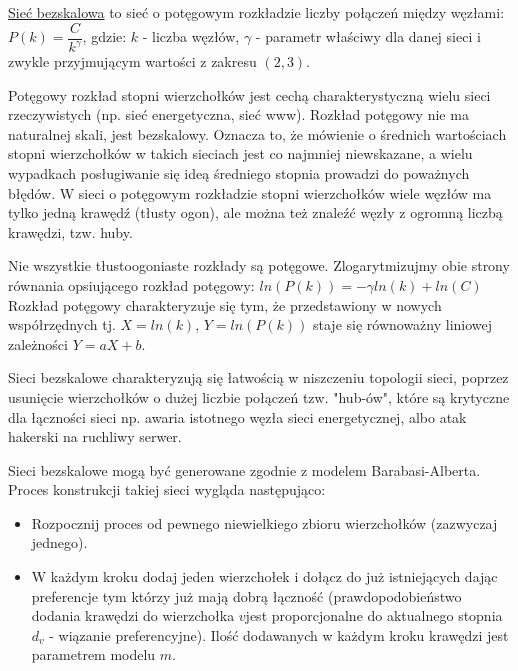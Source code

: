 \underline{Sieć bezskalowa} to sieć o potęgowym rozkładzie liczby połączeń między węzłami:\newline
$ P(k) = \dfrac{C}{k^{\gamma}} $, gdzie:\newline
$ k $ - liczba węzłów, \newline
$ \gamma $ - parametr właściwy dla danej sieci i zwykle przyjmującym wartości z zakresu $ (2, 3) $.

Potęgowy rozkład stopni wierzchołków jest cechą charakterystyczną wielu sieci rzeczywistych (np. sieć energetyczna, sieć www). Rozkład potęgowy nie ma naturalnej skali, jest bezskalowy. Oznacza to, że mówienie o średnich wartościach stopni wierzchołków w takich sieciach jest co najmniej niewskazane, a wielu wypadkach posługiwanie się ideą średniego stopnia prowadzi do poważnych błędów. W sieci o potęgowym rozkładzie stopni wierzchołków wiele węzłów ma tylko jedną krawędź (tłusty ogon), ale można też znaleźć węzły z ogromną liczbą krawędzi, tzw. huby.

Nie wszystkie tłustoogoniaste rozkłady są potęgowe. Zlogarytmizujmy obie strony równania opsiującego rozkład potęgowy:\newline
$ ln(P(k)) = -\gamma ln(k) + ln(C) $\newline
Rozkład potęgowy charakteryzuje się tym, że przedstawiony w nowych współrzędnych tj. $ X = ln(k) $, $ Y = ln(P(k)) $ staje się równoważny liniowej zależności $ Y = aX + b $.

Sieci bezskalowe charakteryzują się łatwością w niszczeniu topologii sieci, poprzez usunięcie wierzchołków o dużej liczbie połączeń tzw. "hub-ów", które są krytyczne dla łączności sieci np. awaria istotnego węzła sieci energetycznej, albo atak hakerski na ruchliwy serwer.

Sieci bezskalowe mogą być generowane zgodnie z modelem Barabasi-Alberta. Proces konstrukcji takiej sieci wygląda następująco:
\begin{itemize}
	\item Rozpocznij proces od pewnego niewielkiego zbioru wierzchołków (zazwyczaj jednego).
	\item W każdym kroku dodaj jeden wierzchołek i dołącz do już istniejących dając preferencje tym którzy już mają dobrą łączność (prawdopodobieństwo dodania krawędzi do wierzchołka $ v $jest proporcjonalne do aktualnego stopnia $ d_v $ - wiązanie preferencyjne). Ilość dodawanych w każdym kroku krawędzi jest parametrem modelu $ m $.
\end{itemize}


